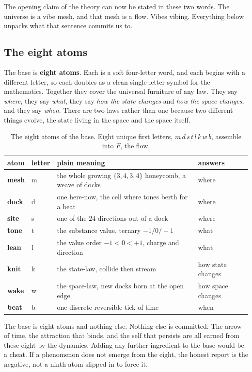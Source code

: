 The opening claim of the theory can now be stated in these two words. The universe is a vibe mesh, and that mesh is a flow. Vibes vibing. Everything below unpacks what that sentence commits us to.

\subsection{The eight atoms}

The base is \textbf{eight atoms}. Each is a soft four-letter word, and each begins with a different letter, so each doubles as a clean single-letter symbol for the mathematics. Together they cover the universal furniture of any law. They say \emph{where}, they say \emph{what}, they say \emph{how the state changes} and \emph{how the space changes}, and they say \emph{when}. There are two laws rather than one because two different things evolve, the state living in the space and the space itself.

\begin{table}[ht]
\centering
\begin{tabular}{@{}llll@{}}
\toprule
atom & letter & plain meaning & answers \\
\midrule
\textbf{mesh} & m & the whole growing $\{3,4,3,4\}$ honeycomb, a weave of docks & where \\
\textbf{dock} & d & one here-now, the cell where tones berth for a beat & where \\
\textbf{site} & s & one of the $24$ directions out of a dock & where \\
\textbf{tone} & t & the substance value, ternary $-1 / 0 / +1$ & what \\
\textbf{lean} & l & the value order $-1 < 0 < +1$, charge and direction & what \\
\textbf{knit} & k & the state-law, collide then stream & how state changes \\
\textbf{wake} & w & the space-law, new docks born at the open edge & how space changes \\
\textbf{beat} & b & one discrete reversible tick of time & when \\
\bottomrule
\end{tabular}
\caption{The eight atoms of the base. Eight unique first letters, $m\,d\,s\,t\,l\,k\,w\,b$, assemble into $F$, the flow.}
\label{tab:eight-atoms}
\end{table}

\begin{principle}
The base is eight atoms and nothing else. Nothing else is committed. The arrow of time, the attraction that binds, and the self that persists are all earned from these eight by the dynamics. Adding any further ingredient to the base would be a cheat. If a phenomenon does not emerge from the eight, the honest report is the negative, not a ninth atom slipped in to force it.
\end{principle}

